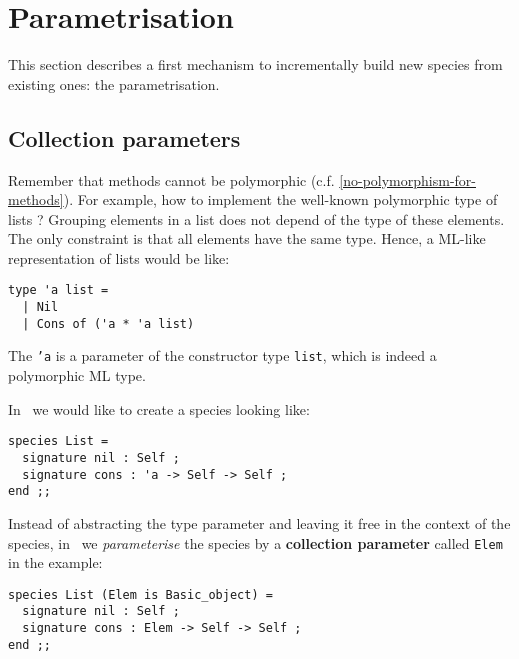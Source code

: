 




\section{Parametrisation}
\label{parametrisation}

This section describes a first mechanism to incrementally build new
species from existing ones: the parametrisation. 
\subsection{Collection parameters}
\label{collection-parameter}
Remember that methods cannot be polymorphic
(c.f. \ref{no-polymorphism-for-methods}). For
example, how to implement the well-known polymorphic type of 
lists ?  Grouping elements in a list does not
depend  of
the type of these elements. The only constraint is that all elements
have the same type. Hence, a ML-like representation of lists would be
like:
{\scriptsize
\lstset{language=Caml}
\begin{lstlisting}
type 'a list =
  | Nil
  | Cons of ('a * 'a list)
\end{lstlisting}
}

The {\tt 'a} is a parameter of the constructor type {\tt list}, which
is indeed a polymorphic ML type. 

 In \focal\ we would like to create a
species looking like: {\scriptsize
\begin{lstlisting}
species List =
  signature nil : Self ;
  signature cons : 'a -> Self -> Self ;
end ;;
\end{lstlisting}
}

Instead of abstracting the type parameter and leaving it free in the
context of the species, in \focal\ we {\em parameterise} the species
by a {\bf collection parameter} called  {\tt Elem} in the example:
{\scriptsize
\begin{lstlisting}
species List (Elem is Basic_object) =
  signature nil : Self ;
  signature cons : Elem -> Self -> Self ;
end ;;
\end{lstlisting}
}

